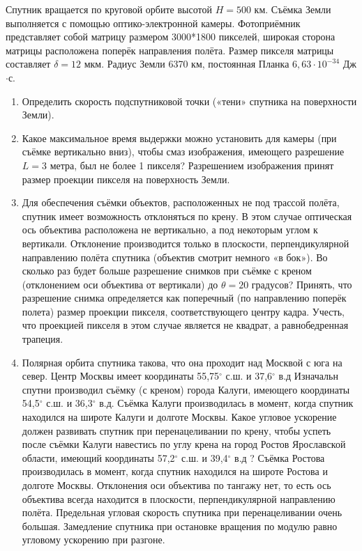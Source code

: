 
Спутник вращается по круговой орбите высотой $H=500$ км. Съёмка Земли выполняется с помощью оптико-электронной 
камеры. Фотоприёмник представляет собой матрицу размером 3000*1800 пикселей, широкая сторона матрицы 
расположена поперёк направления полёта. Размер пикселя матрицы составляет $\delta=12$ мкм. Радиус Земли 6370 км, 
постоянная Планка $6,63\cdot 10^{-34}$ Дж$\cdot$с.

\begin{enumerate}
    \item Определить скорость подспутниковой точки («тени» спутника на поверхности Земли). 
    \item Какое максимальное время выдержки можно установить для камеры (при съёмке вертикально вниз), чтобы смаз 
    изображения, имеющего разрешение $L=3$ метра, был не более 1 пикселя? Разрешением изображения принят 
    размер проекции пикселя на поверхность Земли.
    \item Для обеспечения съёмки объектов, расположенных не под трассой полёта, спутник имеет 
    возможность отклоняться по крену. В этом случае оптическая ось объектива расположена не вертикально, 
    а под некоторым углом к вертикали. Отклонение производится только в плоскости, перпендикулярной 
    направлению полёта спутника (объектив смотрит немного «в бок»). Во сколько раз будет больше разрешение 
    снимков при съёмке с креном (отклонением оси объектива от вертикали) до $\theta=20$ градусов? Принять, 
    что разрешение снимка определяется как поперечный (по направлению поперёк полета) размер проекции пикселя, 
    соответствующего центру кадра. Учесть, что проекцией пикселя в этом случае является не квадрат, а 
    равнобедренная трапеция.
    \item Полярная орбита спутника такова, что она проходит над Москвой с юга на север. Центр Москвы имеет 
    координаты 55,75$^{\circ}$  с.ш. и 37,6$^{\circ}$  в.д Изначальн спутни производил съёмку (с креном) города 
    Калуги, имеющего координаты 54,5$^{\circ}$  с.ш. и 36,3$^{\circ}$ в.д. Съёмка Калуги производилась в момент, 
    когда спутник находился на широте Калуги и долготе Москвы. Какое угловое ускорение должен развивать 
    спутник при перенацеливании по крену, чтобы успеть после съёмки Калуги навестись по углу крена на город 
    Ростов Ярославской области, имеющий координаты 57,2$^{\circ}$ с.ш. и 39,4$^{\circ}$  в.д ? Съёмка Ростова 
    производилась в момент, когда спутник находился на широте Ростова и долготе Москвы. Отклонения оси 
    объектива по тангажу нет, то есть ось объектива всегда находится в плоскости, перпендикулярной направлению 
    полёта. Предельная угловая скорость спутника при перенацеливании очень большая. Замедление спутника при 
    остановке вращения по модулю равно угловому ускорению при разгоне. 
\end{enumerate}

